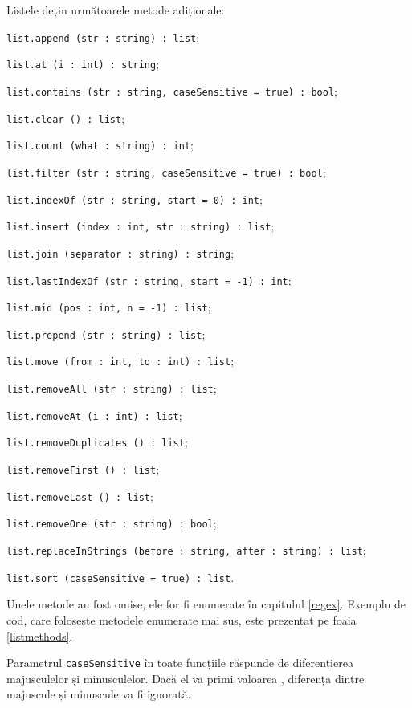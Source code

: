Listele dețin următoarele metode adiționale:
\begin{icItems}
\item \texttt{list.append (str : string) : list};
\item \texttt{list.at (i : int) : string};
\item \texttt{list.contains (str : string, caseSensitive = true) : bool};
\item \texttt{list.clear () : list};
\item \texttt{list.count (what : string) : int};
\item \texttt{list.filter (str : string, caseSensitive = true) : bool};
\item \texttt{list.indexOf (str : string, start = 0) : int};
\item \texttt{list.insert (index : int, str : string) : list};
\item \texttt{list.join (separator : string) : string};
\item \texttt{list.lastIndexOf (str : string, start = -1) : int};
\item \texttt{list.mid (pos : int, n = -1) : list};
\item \texttt{list.prepend (str : string) : list};
\item \texttt{list.move (from : int, to : int) : list};
\item \texttt{list.removeAll (str : string) : list};
\item \texttt{list.removeAt (i : int) : list};
\item \texttt{list.removeDuplicates () : list};
\item \texttt{list.removeFirst () : list};
\item \texttt{list.removeLast () : list};
\item \texttt{list.removeOne (str : string) : bool};
\item \texttt{list.replaceInStrings (before : string, after : string) : list};
\item \texttt{list.sort (caseSensitive = true) : list}.
\end{icItems}

Unele metode au fost omise, ele for fi enumerate în capitulul \ref{regex}. Exemplu de cod, care folosește metodele enumerate mai sus, este prezentat pe foaia \ref{listmethods}. 

Parametrul \texttt{caseSensitive} în toate funcțiile răspunde de diferențierea majusculelor și minusculelor. Dacă el va primi valoarea \false, diferența dintre majuscule și minuscule va fi ignorată.

